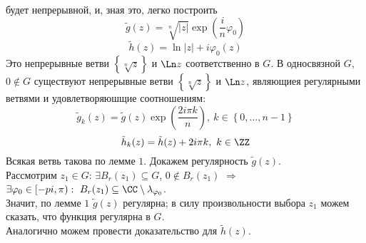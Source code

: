 будет непрерывной, и, зная это, легко построить
\begin{equation}\label{(15.10)}
    \tilde{g}(z) = \sqrt[n]{\left| z \right|} \exp\left( \frac{i}{n} \varphi_0 \right)
\end{equation}
\begin{equation}\label{(15.11)}
    \tilde{h}(z) = \ln \left| z \right| + i \varphi_0(z)
\end{equation}
Это непрерывные ветви $\left\{ \sqrt[n]{z} \right\}$ и $\Ln z$ соответственно в
$G$.
\theorem
В односвязной $G$, $0 \not \in G$ существуют непрерывные ветви $\left\{
    \sqrt[n]{z} \right\}$ и $\Ln z$, являющиея регулярными ветвями и
удовлетворяюшщие соотношениям:
\begin{equation}\label{(15.12)}
    \tilde{g}_k(z) = \tilde{g}(z)\exp\left( \frac{2i\pi k}{n} \right), \ k \in \left\{ 0, \dots, n-1 \right\}
\end{equation}
\begin{equation}\label{(15.13)}
    \tilde{h}_k(z) = \tilde{h}(z) + 2 i \pi k, \ k \in \ZZ
\end{equation}
\pr
Всякая ветвь такова по лемме $1$. Докажем регулярность $\tilde{g}(z)$.
\\
Рассмотрим $z_1 \in G$: $\exists B_r(z_1) \subseteq G$, $0 \not \in B_r(z_1)$
$\Rightarrow$ $\exists \varphi_0 \in [-pi, \pi): \ B_r(z_1) \subseteq \CC
\setminus \lambda_{\varphi_0}$.
\\
Значит, по лемме $1$ $\tilde{g}(z)$ регулярна; в силу произвольности выбора
$z_1$ можем сказать, что функция регулярна в $G$.
\\
Аналогично можем провести доказательство для $\tilde{h}(z)$.
